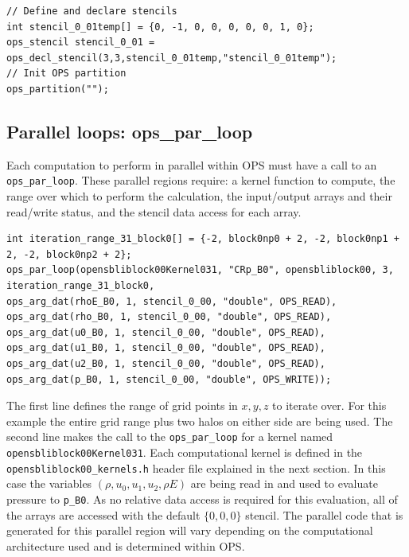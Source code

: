 \documentclass[11pt]{article}
\begin{document}
\begin{lstlisting}
// Define and declare stencils
int stencil_0_01temp[] = {0, -1, 0, 0, 0, 0, 0, 1, 0};
ops_stencil stencil_0_01 = ops_decl_stencil(3,3,stencil_0_01temp,"stencil_0_01temp");
// Init OPS partition
ops_partition("");
\end{lstlisting}

\subsection{Parallel loops: ops\_par\_loop}
Each computation to perform in parallel within OPS must have a call to an \verb|ops_par_loop|. These parallel regions require: a kernel function to compute, the range over which to perform the calculation, the input/output arrays and their read/write status, and the stencil data access for each array. 

\begin{lstlisting}
int iteration_range_31_block0[] = {-2, block0np0 + 2, -2, block0np1 + 2, -2, block0np2 + 2};
ops_par_loop(opensbliblock00Kernel031, "CRp_B0", opensbliblock00, 3, iteration_range_31_block0,
ops_arg_dat(rhoE_B0, 1, stencil_0_00, "double", OPS_READ),
ops_arg_dat(rho_B0, 1, stencil_0_00, "double", OPS_READ),
ops_arg_dat(u0_B0, 1, stencil_0_00, "double", OPS_READ),
ops_arg_dat(u1_B0, 1, stencil_0_00, "double", OPS_READ),
ops_arg_dat(u2_B0, 1, stencil_0_00, "double", OPS_READ),
ops_arg_dat(p_B0, 1, stencil_0_00, "double", OPS_WRITE));
\end{lstlisting}
The first line defines the range of grid points in $x,y,z$ to iterate over. For this example the entire grid range plus two halos on either side are being used. The second line makes the call to the \verb|ops_par_loop| for a kernel named \verb|opensbliblock00Kernel031|. Each computational kernel is defined in the \verb|opensbliblock00_kernels.h| header file explained in the next section. In this case the variables $\left(\rho, u_0, u_1, u_2, \rho E\right)$ are being read in and used to evaluate pressure to \verb|p_B0|. As no relative data access is required for this evaluation, all of the arrays are accessed with the default $\{0,0,0\}$ stencil. The parallel code that is generated for this parallel region will vary depending on the computational architecture used and is determined within OPS.
\end{document}
